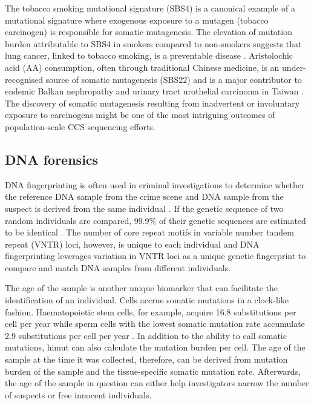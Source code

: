 The tobacco smoking mutational signature (SBS4) is a canonical example of a mutational signature where exogenous exposure to a mutagen (tobacco carcinogen) is responsible for somatic mutagenesis. The elevation of mutation burden attributable to SBS4 in smokers compared to non-smokers suggests that lung cancer, linked to tobacco smoking, is a preventable disease \cite{Alexandrov2016-uw}. Aristolochic acid (AA) consumption, often through traditional Chinese medicine, is an under-recognised source of somatic mutagenesis (SBS22) and is a major contributor to endemic Balkan nephropathy \cite{Grollman2007-rh} and urinary tract urothelial carcinoma in Taiwan \cite{Chen2012-vh}. The discovery of somatic mutagenesis resulting from inadvertent or involuntary exposure to carcinogens might be one of the most intriguing outcomes of population-scale CCS sequencing efforts. 

\subsection{DNA forensics}

DNA fingerprinting is often used in criminal investigations to determine whether the reference DNA sample from the crime scene and DNA sample from the suspect is derived from the same individual \cite{Gill1985-dt}. If the genetic sequence of two random individuals are compared, 99.9\% of their genetic sequences are estimated to be identical \cite{1000_Genomes_Project_Consortium2012-rj}. The number of core repeat motifs in variable number tandem repeat (VNTR) loci, however, is unique to each individual and DNA fingerprinting leverages variation in VNTR loci as a unique genetic fingerprint to compare and match DNA samples from different individuals. 

The age of the sample is another unique biomarker that can facilitate the identification of an individual. Cells accrue somatic mutations in a clock-like fashion. Haematopoietic stem cells, for example, acquire 16.8 substitutions per cell per year \cite{Mitchell2022-ry, Osorio2018-mh} while sperm cells with the lowest somatic mutation rate accumulate 2.9 substitutions per cell per year \cite{Rahbari2016-ot}. In addition to the ability to call somatic mutations, himut can also calculate the mutation burden per cell. The age of the sample at the time it was collected, therefore, can be derived from mutation burden of the sample and the tissue-specific somatic mutation rate. Afterwards, the age of the sample in question can either help investigators narrow the number of suspects or free innocent individuals.  

